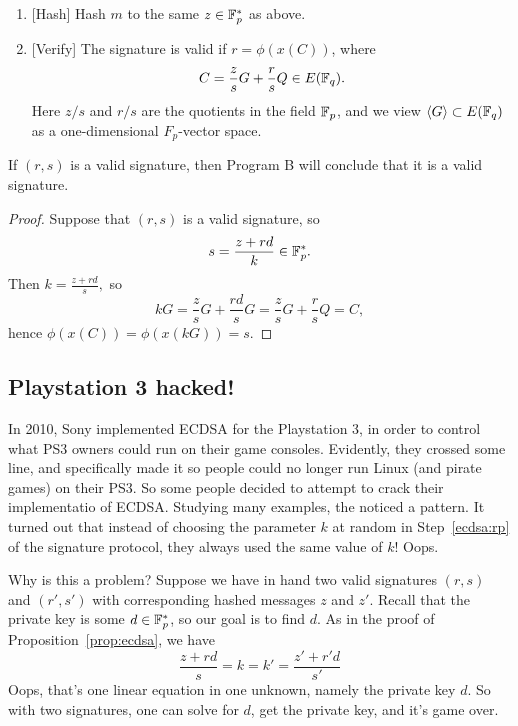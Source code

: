 \documentclass{book}
\begin{document}
\begin{enumerate}
\item{}[Hash] Hash $m$ to the same $z\in \mathbb{F}_p^*$ as above.
\item{}[Verify] The signature is valid if $r=\phi(x(C))$,
where
$$C = \frac{z}{s} G + \frac{r}{s} Q \in E(\mathbb{F}_q).$$
Here $z/s$ and $r/s$ are the quotients in the field $\mathbb{F}_p$, and
we view $\langle G\rangle \subset E(\mathbb{F}_q)$
as a one-dimensional $F_p$-vector space.
\end{enumerate}


\begin{proposition}\label{prop:ecdsa}
If $(r,s)$ is a valid signature, then Program B will conclude that
it is a valid signature.
\end{proposition}
\begin{proof}
Suppose that $(r,s)$ is a valid signature, so
$$s = \frac{z+rd}{k} \in \mathbb{F}_p^*.$$
Then
$
k = \frac{z+rd}{s},
$
so
$$
k G = \frac{z}{s} G + \frac{rd}{s} G
  = \frac{z}{s} G + \frac{r}{s} Q = C,
$$
hence $\phi(x(C)) = \phi(x(kG)) = s$.

\end{proof}

\subsection{Playstation 3 hacked!}

In 2010, Sony implemented ECDSA for the Playstation 3, in order to control
what PS3 owners could run on their game consoles.  Evidently, they crossed
some line, and specifically made it so people could no longer run Linux (and
pirate games) on their PS3.  So some people decided to attempt to crack
their implementatio of ECDSA.  Studying many examples, the noticed a pattern.
It turned out that instead of choosing the parameter $k$
at random in Step~\ref{ecdsa:rp} of the signature protocol, they
always used the same value of $k$!  Oops.

Why is this a problem?  Suppose we have in hand two valid
signatures $(r,s)$ and $(r',s')$ with corresponding hashed
messages $z$ and $z'$.  Recall that the private
key is some $d\in\mathbb{F}_p^*$, so our goal is to find $d$.
As in the proof of Proposition~\ref{prop:ecdsa}, we have
\begin{equation}\label{eqn:ecdsacrack}
\frac{z+rd}{s} = k = k' = \frac{z' + r'd}{s'}
\end{equation}
Oops, that's one linear equation in one unknown, namely the private
key $d$.  So with two signatures, one can solve for $d$, get
the private key, and it's game over.
\end{document}
